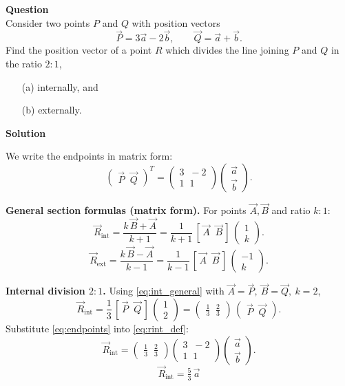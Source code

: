\documentclass[article,12pt,onecolumn]{IEEEtran}
\theoremstyle{remark}
\begin{document}
\textbf{Question}\\[2pt]
Consider two points $P$ and $Q$ with position vectors
\[
\vec{P}=3\vec{a}-2\vec{b},
\qquad
\vec{Q}=\vec{a}+\vec{b}.
\]
Find the position vector of a point $R$ which divides the line joining $P$ and $Q$ in the ratio $2:1$,
\begin{enumerate}
    \item[(a)] internally, and
    \item[(b)] externally.
\end{enumerate}

\vspace{6pt}
\textbf{Solution}\\[2pt]

\newcommand{\myvec}[1]{\begin{pmatrix}#1\end{pmatrix}}

\noindent We write the endpoints in matrix form:
\begin{equation}
\myvec{\vec P \;\; \vec Q}^{T}
=
\myvec{3 \;\; -2 \\[2pt] 1 \;\; 1}
\myvec{\vec a \\[2pt] \vec b}.
\label{eq:endpoints}
\end{equation}

\noindent \textbf{General section formulas (matrix form).}
For points \(\vec A,\vec B\) and ratio \(k:1\):
\begin{equation}
\vec R_{\text{int}}
=\frac{k\,\vec B+\vec A}{k+1}
=\frac{1}{k+1}\,[\,\vec A\;\;\vec B\,]\,
\myvec{1\\ k}.
\label{eq:int_general}
\end{equation}
\begin{equation}
\vec R_{\text{ext}}
=\frac{k\,\vec B-\vec A}{k-1}
=\frac{1}{k-1}\,[\,\vec A\;\;\vec B\,]\,
\myvec{-1\\ k}.
\label{eq:ext_general}
\end{equation}

\noindent \textbf{Internal division \(2:1\).}
Using \eqref{eq:int_general} with \(\vec A=\vec P,\ \vec B=\vec Q,\ k=2\),
\begin{equation}
\vec R_{\text{int}}
=\frac{1}{3}\,[\,\vec P\;\;\vec Q\,]\,
\myvec{1\\ 2}
=\myvec{\tfrac13 \;\; \tfrac23}\, \myvec{\vec P \;\; \vec Q}.
\label{eq:rint_def}
\end{equation}
Substitute \eqref{eq:endpoints} into \eqref{eq:rint_def}:
\begin{equation}
\vec R_{\text{int}}
=
\myvec{\tfrac13 \;\; \tfrac23}
\myvec{3 \;\; -2 \\[2pt] 1 \;\; 1}
\myvec{\vec a \\[2pt] \vec b}.
\label{eq:rint_sub}
\end{equation}
\begin{equation}
\boxed{\;\vec R_{\text{int}}=\tfrac{5}{3}\,\vec a\;}
\label{eq:rint_final}
\end{equation}
\end{document}
